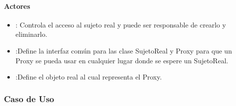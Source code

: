 \paragraph{Actores}

\begin{itemize}
	\item {}: Controla el acceso al sujeto real y puede ser responsable de crearlo y eliminarlo.
	\item {}:Define la interfaz común para las clase SujetoReal y Proxy para que un Proxy se pueda usar en cualquier lugar donde se espere un SujetoReal.
	\item {}:Define el objeto real al cual representa el Proxy.
\end{itemize}


\subsubsection{Caso de Uso}
